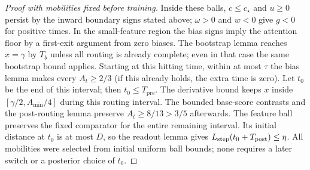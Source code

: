 \begin{proof}[Proof with mobilities fixed before training]
Inside these balls, $c\le c_\star$ and $u\ge0$ persist by the inward
boundary signs stated above; $\omega>0$ and $w<0$ give $g<0$ for positive
times. In the small-feature region the bias signs imply the attention
floor by a first-exit argument from zero biases. The bootstrap lemma
reaches $x=\gamma$ by $T_b$ unless all routing is already complete;
even in that case the same bootstrap bound applies. Starting at this
hitting time, within at most $\tau$ the bias lemma makes every
$A_t\ge2/3$ (if this already holds, the extra time is zero). Let $t_0$
be the end of this interval; then $t_0\le T_{\mathrm{pre}}$.
The derivative bound keeps $x$ inside $[\gamma/2,A_{\min}/4]$ during
this routing interval. The bounded base-score contrasts and the
post-routing lemma preserve $A_t\ge8/13>3/5$ afterwards.
The feature ball preserves the fixed comparator for the entire remaining
interval. Its initial distance at $t_0$ is at most $D$, so the readout
lemma gives $L_{\mathrm{step}}(t_0+T_{\mathrm{post}})\le\eta$.
All mobilities were selected from initial uniform ball bounds; none
requires a later switch or a posterior choice of $t_0$.
\end{proof}


